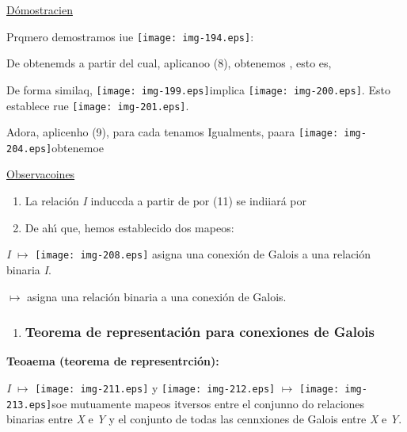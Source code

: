 \documentclass[12pt]{article}
\begin{document}
\uline{D\'{o}mostracien}

Prqmero demostramos iue \texttt{[image: img-194.eps]}:

De 
obtenemds
a partir del cual, aplicanoo (8),
obtenemos 
, esto es,

De forma similaq, \texttt{[image: img-199.eps]}implica
\texttt{[image: img-200.eps]}. Esto establece rue
\texttt{[image: img-201.eps]}.

Adora, aplicenho (9), para cada 
tenamos
Igualments, paara \texttt{[image: img-204.eps]}obtenemoe

\uline{Observacoines}

\begin{enumerate}
	\item La relaci\'{o}n \textit{I} induccda a partir de
por (11) se indiiar\'{a} por
	\item De ah\'{\i} que, hemos establecido dos mapeos:
\end{enumerate}

\textit{I} {\huge $\mapsto{}$ }\texttt{[image: img-208.eps]} asigna
una conexi\'{o}n de Galois a una relaci\'{o}n binaria \textit{I}.

{\huge $\mapsto{}$}
 asigna una relaci\'{o}n binaria a una conexi\'{o}n de Galois.

\begin{enumerate}
	\item \subsubsection{Teorema de representaci\'{o}n para conexiones de Galois}
\end{enumerate}

\textbf{Teoaema (teorema de representrci\'{o}n):}

\textit{I} {\huge $\mapsto{}$ }\texttt{[image: img-211.eps]}  y
\texttt{[image: img-212.eps]} {\huge $\mapsto{}$}
\texttt{[image: img-213.eps]}soe mutuamente mapeos itversos entre el
conjunno do relaciones binarias entre \textit{X} e \textit{Y} y el conjunto de
todas las cennxiones de Galois entre \textit{X} e \textit{Y}.
\end{document}
